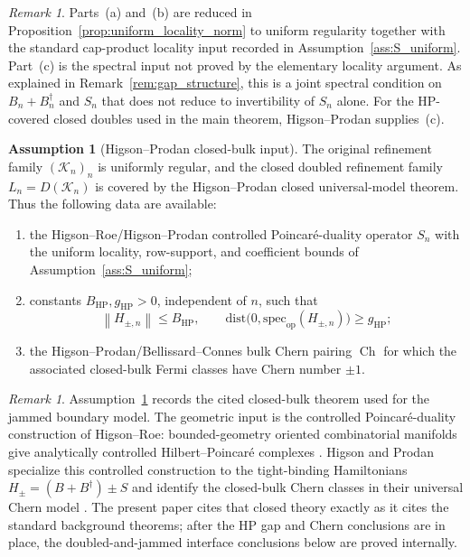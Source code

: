 \documentclass[11pt]{article}
\numberwithin{equation}{section}
\theoremstyle{definition}
\newtheorem{assumption}[theorem]{Assumption}
\theoremstyle{remark}
\newtheorem{remark}[theorem]{Remark}
\newcommand{\K}{\mathcal{K}}
\newcommand{\spec}{\mathrm{spec}}
\newcommand{\dist}{\mathrm{dist}}
\newcommand{\opnorm}[1]{\left\lVert#1\right\rVert}
\newcommand{\Ch}{\operatorname{Ch}}
\begin{document}
\begin{remark}\label{rem:assumption_status}
Parts~(a) and~(b) are reduced in Proposition~\ref{prop:uniform_locality_norm} to uniform regularity
together with the standard cap-product locality input recorded in
Assumption~\ref{ass:S_uniform}. Part~(c) is the spectral input not proved by the elementary locality
argument. As explained in Remark~\ref{rem:gap_structure}, this is a joint spectral condition on
$B_n+B_n^\dagger$ and $S_n$ that does not reduce to invertibility of $S_n$ alone. For the
HP-covered closed doubles used in the main theorem, Higson--Prodan supplies~(c).
\end{remark}

\begin{assumption}[Higson--Prodan closed-bulk input]\label{ass:hp_admissibility}
The original refinement family $(\K_n)_n$ is uniformly regular, and the closed doubled refinement
family $L_n=D(\K_n)$ is covered by the Higson--Prodan closed universal-model theorem. Thus the
following data are available:
\begin{enumerate}[label=(\alph*),leftmargin=2em]
\item the Higson--Roe/Higson--Prodan controlled Poincar\'e-duality operator $S_n$ with the
uniform locality, row-support, and coefficient bounds of Assumption~\ref{ass:S_uniform};
\item constants $B_{\mathrm{HP}},g_{\mathrm{HP}}>0$, independent of $n$, such that
\[
\opnorm{H_{\pm,n}}\le B_{\mathrm{HP}},
\qquad
\dist\bigl(0,\spec_{\mathrm{op}}(H_{\pm,n})\bigr)\ge g_{\mathrm{HP}};
\]
\item the Higson--Prodan/Bellissard--Connes bulk Chern pairing $\Ch$ for which the associated
closed-bulk Fermi classes have Chern number $\pm1$.
\end{enumerate}
\end{assumption}

\begin{remark}\label{rem:hp_admissibility_status}
Assumption~\ref{ass:hp_admissibility} records the cited closed-bulk theorem used for the jammed
boundary model. The geometric input is the controlled Poincar\'e-duality construction of
Higson--Roe: bounded-geometry oriented combinatorial manifolds give analytically controlled
Hilbert--Poincar\'e complexes
\cite[Theorem~3.14 and Proposition~4.1]{HigsonRoeII}. Higson and Prodan specialize this
controlled construction to the tight-binding Hamiltonians $H_\pm=(B+B^\dagger)\pm S$ and identify
the closed-bulk Chern classes in their universal Chern model
\cite{HigsonProdanUniversalPRL,HigsonProdanUniversalArxiv}. The present paper cites that closed
theory exactly as it cites the standard background theorems; after the HP gap and Chern
conclusions are in place, the doubled-and-jammed interface conclusions below are proved internally.
\end{remark}
\end{document}
